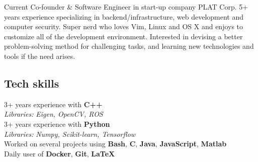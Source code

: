 \documentclass[letterpaper]{soragna-onepage-twocols} %
\begin{document}
\begin{minipage}[t]{0.3\textwidth} %



Current Co-founder \& Software Engineer in start-up company PLAT Corp. 
5+ years experience specializing in backend/infrastructure, web development and computer security. 
Super nerd who loves Vim, Linux and OS X and enjoys to customize all of the development environment. 
Interested in devising a better problem-solving method for challenging tasks, and learning new technologies and tools if the need arises.

\sectionspace %




\vspace{-12pt} %
\sectionspace %



\subsection{Tech skills}

3+ years experience with \textbf{C++}\\
{\emph{Libraries:} \small\emph{Eigen, OpenCV, ROS}}\\
3+ years experience with \textbf{Python}\\
{\emph{Libraries:} \small\emph{Numpy, Scikit-learn, Tensorflow}}\\
Worked on several projects using \textbf{Bash}, \textbf{C}, \textbf{Java}, \textbf{JavaScript},  \textbf{Matlab}\\
Daily user of \textbf{Docker}, \textbf{Git}, \textbf{LaTeX}\\


\end{minipage}
\end{document}

